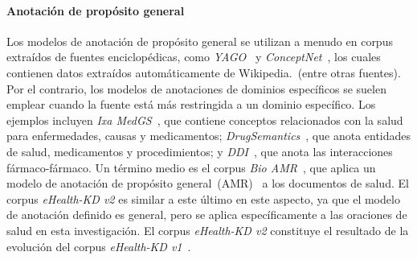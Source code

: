 \paragraph{Anotación de propósito general}

Los modelos de anotación de propósito general se utilizan a menudo en corpus extraídos de fuentes enciclopédicas, como \textit{YAGO}~\cite{suchanek2007yago} y \textit{ConceptNet}~\cite{speer2017conceptnet}, los cuales contienen datos extraídos automáticamente de Wikipedia.~(entre otras fuentes). Por el contrario, los modelos de anotaciones de dominios específicos se suelen emplear cuando la fuente está más restringida a un dominio específico. Los ejemplos incluyen \textit{Ixa MedGS}~\cite{ORONOZ2015318}, que contiene conceptos relacionados con la salud para enfermedades, causas y medicamentos; \textit{DrugSemantics}~\cite{moreno2017drugsemantics}, que anota entidades de salud, medicamentos y procedimientos; y \textit{DDI}~\cite{herrero2013ddi}, que anota las interacciones fármaco-fármaco. Un término medio es el corpus \textit{Bio AMR}~\cite{bioamr}, que aplica un modelo de anotación de propósito general~(AMR)~\cite{banarescu2013abstract} a los documentos de salud. El corpus \textit{eHealth-KD v2} es similar a este último en este aspecto, ya que el modelo de anotación definido es general, pero se aplica específicamente a las oraciones de salud en esta investigación.
El corpus \textit{eHealth-KD v2} constituye el resultado de la evolución del corpus \textit{eHealth-KD v1}~\cite{ehealth}.

